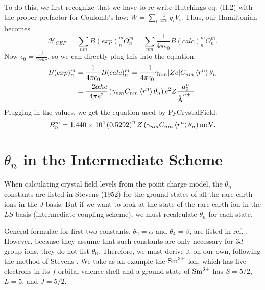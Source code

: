 \documentclass[twocolumn,english,prb]{revtex4-2}
\newcommand{\angstrom}{${\buildrel _{\circ} \over {\mathrm{A}}}$}
\begin{document}
To do this, we first recognize that we have to re-write Hutchings
eq. (II.2) with the proper prefactor for Coulomb's law: $W=\sum_{i}\frac{1}{4\pi\epsilon_{0}}q_{i}V_{i}$. Thus,
our Hamiltonian becomes
$$
\mathcal{H}_{CEF}\,=\sum_{nm}B(exp)_{n}^{m}O_{n}^{m}=\sum_{nm}\frac{1}{4\pi\epsilon_{0}}B(calc)_{n}^{m}O_{n}^{m}.
$$
Now $\epsilon_{0}=\frac{e^{2}}{2\alpha hc}$, so we can directly plug this into the equation:
$$ 
\begin{aligned}
B(exp)_{n}^{m} & = \frac{1}{4\pi\epsilon_{0}}B(calc)_{n}^{m}=\frac{-1}{4\pi\epsilon_{0}}\gamma_{nm}|Ze|C_{nm}\left\langle r^{n}\right\rangle \theta_{n} \\
& =\frac{-2\alpha hc}{4\pi e^{2}}\left(\gamma_{nm}C_{nm}\left\langle r^{n}\right\rangle \theta_{n}\right)e^{2}Z\frac{a_{0}^{n}}{\textrm{\angstrom}^{n+1}}.
\end{aligned}
$$
Plugging in the values, we get the equation used by PyCrystalField:
\begin{equation}
B_{n}^{m}=1.440\times10^{4}\left(0.5292\right)^{n}Z\left(\gamma_{nm}C_{nm}\left\langle r^{n}\right\rangle \theta_{n}\right){\rm meV}.
\end{equation}




\section{$\theta_n$ in the Intermediate Scheme} \label{IntermediateScheme}


When calculating crystal field levels from the point charge model, the $\theta_{n}$ constants are
listed in Stevens (1952) \cite{Stevens1952} for the ground states of all the rare earth
ions in the $J$ basis. But if we want to look at the state of the rare earth ion in
the $LS$ basis (intermediate coupling scheme), we must recalculate $\theta_{n}$ for each state.

General formulae for first two constants, $\theta_{2}=\alpha$ and $\theta_{4}=\beta$,
are listed in ref. \cite{BleaneyStevens1953}. However, because they assume that such constants are only necessary
for $3d$ group ions, they do not list $\theta_{6}$. Therefore, we must derive it on our own, following the method of Stevens \cite{Stevens1952}. We take as an example the ${\rm Sm}^{3+}$ ion, which has five electrons in its $f$ orbital valence shell
and a ground state of ${\rm Sm}^{3+}$ has $S=5/2$, $L=5$, and $J=5/2$.
\end{document}
